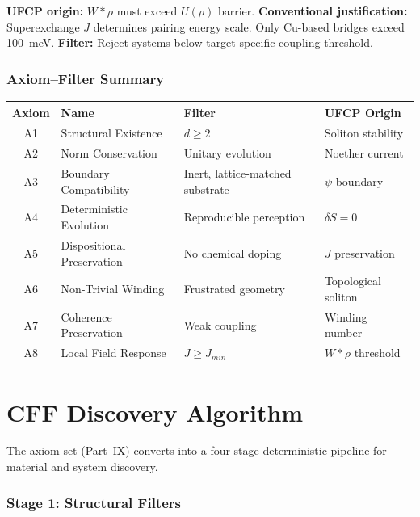 \documentclass[11pt, a4paper]{article}
\begin{document}
\textbf{UFCP origin:} $W * \rho$ must exceed $U(\rho)$ barrier.
\textbf{Conventional justification:} Superexchange $J$ determines
pairing energy scale. Only Cu-based bridges exceed 100~meV.
\textbf{Filter:} Reject systems below target-specific coupling
threshold.

\section{Axiom--Filter Summary}

\begin{center}
\begin{tabular}{@{}clll@{}}
\toprule
\textbf{Axiom} & \textbf{Name} & \textbf{Filter} &
  \textbf{UFCP Origin} \\
\midrule
A1 & Structural Existence & $d \geq 2$ &
  Soliton stability \\
A2 & Norm Conservation & Unitary evolution &
  Noether current \\
A3 & Boundary Compatibility & Inert, lattice-matched substrate &
  $\psi$ boundary \\
A4 & Deterministic Evolution & Reproducible perception &
  $\delta S = 0$ \\
A5 & Dispositional Preservation & No chemical doping &
  $J$ preservation \\
A6 & Non-Trivial Winding & Frustrated geometry &
  Topological soliton \\
A7 & Coherence Preservation & Weak coupling &
  Winding number \\
A8 & Local Field Response & $J \geq J_{min}$ &
  $W * \rho$ threshold \\
\bottomrule
\end{tabular}
\end{center}

\newpage

\part{CFF Discovery Algorithm}

The axiom set (Part~IX) converts into a four-stage deterministic
pipeline for material and system discovery.

\section{Stage 1: Structural Filters}
\end{document}

